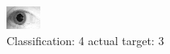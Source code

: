 \begin{figure}[h!]
\begin{center}
\includegraphics[width=0.60\columnwidth]{figures/ID1825_class_4_target_3.png}
\end{center}
\caption{ Classification: 4 actual target: 3}
\label{fig:ID1825_class_4_target_3}
\end{figure}

